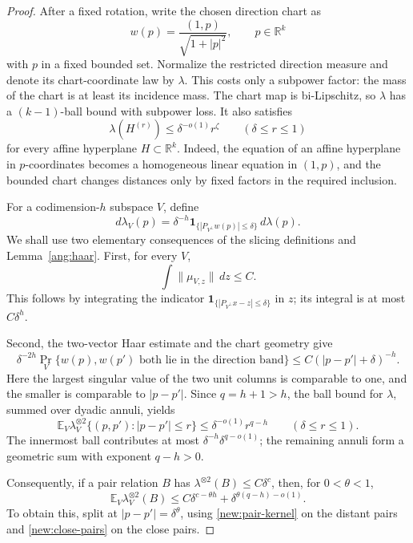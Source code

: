 \begin{proof}
After a fixed rotation, write the chosen direction chart as
\[
w(p)=\frac{(1,p)}{\sqrt{1+|p|^2}},
\qquad p\in\mathbb R^k
\]
with \(p\) in a fixed bounded set. Normalize the restricted direction measure and denote its chart-coordinate law by \(\lambda\). This costs only a subpower factor: the mass of the chart is at least its incidence mass. The chart map is bi-Lipschitz, so \(\lambda\) has a \((k-1)\)-ball bound with subpower loss. It also satisfies
\[
\lambda(H^{(r)})\le \delta^{-o(1)}r^\zeta
\qquad(\delta\le r\le1)
\]
for every affine hyperplane \(H\subset\mathbb R^k\). Indeed, the equation of an affine hyperplane in \(p\)-coordinates becomes a homogeneous linear equation in \((1,p)\), and the bounded chart changes distances only by fixed factors in the required inclusion.

For a codimension-\(h\) subspace \(V\), define
\[
d\lambda_V(p)=
\delta^{-h}\mathbf 1_{\{|P_{V^\perp}w(p)|\le\delta\}}\,d\lambda(p).
\]
We shall use two elementary consequences of the slicing definitions and Lemma~\ref{ang:haar}. First, for every \(V\),
\begin{equation}\label{new:point-total}
\int \|\mu_{V,z}\|\,dz\le C.
\end{equation}
This follows by integrating the indicator
\(\mathbf 1_{\{|P_{V^\perp}x-z|\le\delta\}}\) in \(z\); its integral is at most \(C\delta^h\).

Second, the two-vector Haar estimate and the chart geometry give
\begin{equation}\label{new:pair-kernel}
\delta^{-2h}
\Pr_V\{w(p),w(p')\text{ both lie in the direction band}\}
\le C(|p-p'|+\delta)^{-h}.
\end{equation}
Here the largest singular value of the two unit columns is comparable to one, and the smaller is comparable to \(|p-p'|\). Since \(q=h+1>h\), the ball bound for \(\lambda\), summed over dyadic annuli, yields
\begin{equation}\label{new:close-pairs}
\mathbb E_V\lambda_V^{\otimes2}
 \{(p,p'):|p-p'|\le r\}
\le \delta^{-o(1)}r^{q-h}
\qquad(\delta\le r\le1).
\end{equation}
The innermost ball contributes at most
\(\delta^{-h}\delta^{q-o(1)}\); the remaining annuli form a geometric sum with exponent \(q-h>0\).

Consequently, if a pair relation \(B\) has
\(\lambda^{\otimes2}(B)\le C\delta^c\), then, for \(0<\theta<1\),
\begin{equation}\label{new:pair-transfer}
\mathbb E_V\lambda_V^{\otimes2}(B)
\le C\delta^{c-\theta h}
   +\delta^{\theta(q-h)-o(1)}.
\end{equation}
To obtain this, split at \(|p-p'|=\delta^\theta\), using
\eqref{new:pair-kernel} on the distant pairs and
\eqref{new:close-pairs} on the close pairs.


\end{proof}
